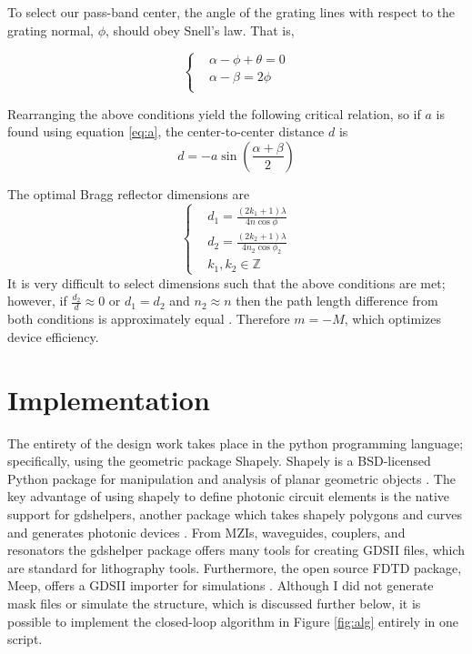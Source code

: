 \documentclass{article}
\begin{document}
To select our pass-band center, the angle of the grating lines with respect to the grating normal, $\phi$, should obey Snell's law. That is,

\begin{equation*}
    \left \lbrace
    \begin{aligned}
        &\alpha - \phi + \theta = 0\\
        &\alpha - \beta = 2 \phi\\
    \end{aligned}
    \right.
\end{equation*}

Rearranging the above conditions yield the following critical relation, so if $a$ is found using equation \ref{eq:a}, the center-to-center distance $d$ is
\begin{equation}
d = -a \sin (\frac{\alpha + \beta}{2})
    \label{eq:d}
\end{equation}

The optimal Bragg reflector dimensions are
\begin{equation*}
    \left \lbrace
    \begin{aligned}
        &d_1 = \frac{(2 k_1 +1) \lambda}{4 n \cos{\phi}}\\
        &d_2 = \frac{(2 k_2 +1) \lambda}{4 n_2 \cos{\phi_2}}\\
        &k_1, k_2 \in \mathbb{Z}
    \end{aligned}
    \right.
\end{equation*}
It is very difficult to select dimensions such that the above conditions are met; however, if $\frac{d_2}{d} \approx 0$ or $d_1 = d_2$ and $n_2 \approx  n$ then the path length difference from both conditions is approximately equal \cite{Packirisamy2012Mono-OrderGrating, Pottier2014IntegratedInsulator}. Therefore $m=-M$, which optimizes device efficiency.


\section{Implementation}
    The entirety of the design work takes place in the python programming language; specifically, using the geometric package Shapely. Shapely is a BSD-licensed Python package for manipulation and analysis of planar geometric objects \cite{ShapelyDocumentation}. The key advantage of using shapely to define photonic circuit elements is the native support for gdshelpers, another package which takes shapely polygons and curves and generates photonic devices \cite{WelcomeDocumentation}. From MZIs, waveguides, couplers, and resonators the gdshelper package offers many tools for creating GDSII files, which are standard for lithography tools. Furthermore, the open source FDTD package, Meep, offers a GDSII importer for simulations \cite{ManualDocumentation}. Although I did not generate mask files or simulate the structure, which is discussed further below, it is possible to implement the closed-loop algorithm in Figure \ref{fig:alg} entirely in one script.
\end{document}
